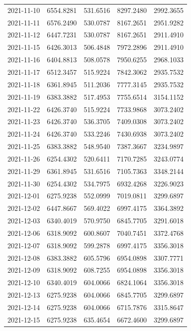 \begin{footnotesize}
\begin{longtable}{lllll}
2021-11-10 & 6554.8281 & 531.6516 & 8297.2480 & 2992.3655 \\
2021-11-11 & 6576.2490 & 530.0787 & 8167.2651 & 2951.9282 \\
2021-11-12 & 6447.7231 & 530.0787 & 8167.2651 & 2911.4910 \\
2021-11-15 & 6426.3013 & 506.4848 & 7972.2896 & 2911.4910 \\
2021-11-16 & 6404.8813 & 508.0578 & 7950.6255 & 2968.1033 \\
2021-11-17 & 6512.3457 & 515.9224 & 7842.3062 & 2935.7532 \\
2021-11-18 & 6361.8945 & 511.2036 & 7777.3145 & 2935.7532 \\
2021-11-19 & 6383.3882 & 517.4953 & 7755.6514 & 3154.1152 \\
2021-11-22 & 6426.3740 & 515.9224 & 7733.9868 & 3073.2402 \\
2021-11-23 & 6426.3740 & 536.3705 & 7409.0308 & 3073.2402 \\
2021-11-24 & 6426.3740 & 533.2246 & 7430.6938 & 3073.2402 \\
2021-11-25 & 6383.3882 & 548.9540 & 7387.3667 & 3234.9897 \\
2021-11-26 & 6254.4302 & 520.6411 & 7170.7285 & 3243.0774 \\
2021-11-29 & 6361.8945 & 531.6516 & 7105.7363 & 3348.2144 \\
2021-11-30 & 6254.4302 & 534.7975 & 6932.4268 & 3226.9023 \\
2021-12-01 & 6275.9238 & 552.0999 & 7019.0811 & 3299.6897 \\
2021-12-02 & 6447.8667 & 569.4022 & 6997.4175 & 3364.3892 \\
2021-12-03 & 6340.4019 & 570.9750 & 6845.7705 & 3291.6018 \\
2021-12-06 & 6318.9092 & 600.8607 & 7040.7451 & 3372.4768 \\
2021-12-07 & 6318.9092 & 599.2878 & 6997.4175 & 3356.3018 \\
2021-12-08 & 6383.3882 & 605.5796 & 6954.0898 & 3307.7771 \\
2021-12-09 & 6318.9092 & 608.7255 & 6954.0898 & 3356.3018 \\
2021-12-10 & 6340.4019 & 604.0066 & 6824.1064 & 3356.3018 \\
2021-12-13 & 6275.9238 & 604.0066 & 6845.7705 & 3299.6897 \\
2021-12-14 & 6275.9238 & 604.0066 & 6715.7876 & 3315.8647 \\
2021-12-15 & 6275.9238 & 635.4654 & 6672.4600 & 3299.6897 \\

\end{longtable}
\end{footnotesize}
